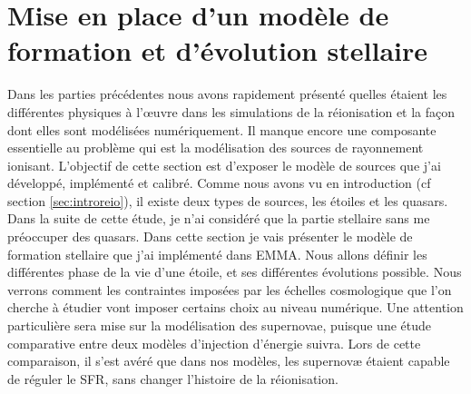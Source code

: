 \chapter{Mise en place d'un modèle de formation et d'évolution stellaire}
\label{sec:etoiles}

Dans les parties précédentes nous avons rapidement présenté quelles étaient les différentes physiques à l’œuvre dans les simulations de la réionisation et la façon dont elles sont modélisées numériquement.
Il manque encore une composante essentielle au problème qui est la modélisation des sources de rayonnement ionisant.
L'objectif de cette section est d'exposer le modèle de sources que j'ai développé, implémenté et calibré.
Comme nous avons vu en introduction (cf section \ref{sec:introreio}), il existe deux types de sources, les étoiles et les quasars.
Dans la suite de cette étude, je n'ai considéré que la partie stellaire sans me préoccuper des quasars.
Dans cette section je vais présenter le modèle de formation stellaire que j'ai implémenté dans EMMA.
Nous allons définir les différentes phase de la vie d'une étoile, et ses différentes évolutions possible.
Nous verrons comment les contraintes imposées par les échelles cosmologique que l'on cherche à étudier vont imposer certains choix au niveau numérique.
Une attention particulière sera mise sur la modélisation des supernovae, puisque une étude comparative entre deux modèles d'injection d'énergie suivra.
Lors de cette comparaison, il s'est avéré que dans nos modèles, les supernovæ étaient capable de réguler le \ac{SFR}, sans changer l'histoire de la réionisation.

%


